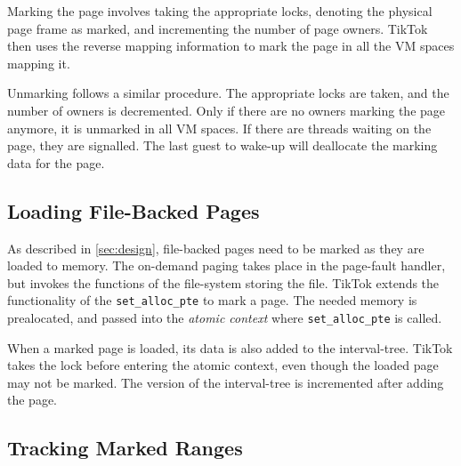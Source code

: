\documentclass[conference]{IEEEtran}
\newcommand{\sysname}{TikTok}
\begin{document}
Marking the page involves taking the appropriate locks, denoting the physical
page frame as marked, and incrementing the number of page owners. \sysname{} then
uses the reverse mapping information to mark the page in all the VM spaces
mapping it.

Unmarking follows a similar procedure. The appropriate locks are taken, and the
number of owners is decremented. Only if there are no owners marking the page
anymore, it is unmarked in all VM spaces. If there are threads waiting on the
page, they are signalled. The last guest to wake-up will deallocate the marking
data for the page.

\subsection{Loading File-Backed Pages}

As described in \autoref{sec:design}, file-backed pages need to be marked as
they are loaded to memory. The on-demand paging takes place in the page-fault
handler, but invokes the functions of the file-system storing the file. \sysname
extends the functionality of the \texttt{set\_alloc\_pte} to mark a page. The
needed memory is prealocated, and passed into the \emph{atomic context} where 
\texttt{set\_alloc\_pte} is called.

When a marked page is loaded, its data is also added to the interval-tree.
\sysname{} takes the lock before entering the atomic context, even though the
loaded page may not be marked. The version of the interval-tree is incremented
after adding the page.

\subsection{Tracking Marked Ranges}
\end{document}
